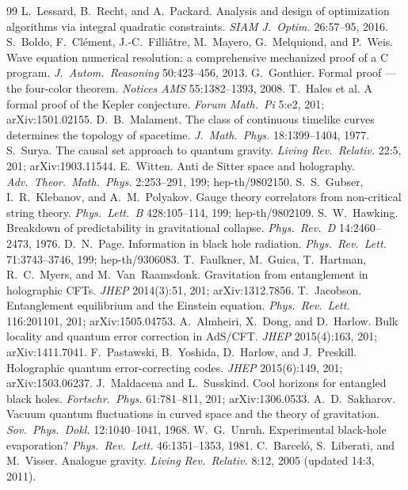 \documentclass[10pt,twocolumn]{article}
\theoremstyle{definition}
\begin{document}
\begin{thebibliography}{99}
 L.~Lessard, B.~Recht, and A.~Packard. Analysis and design of optimization algorithms via integral quadratic constraints. \emph{SIAM J.\ Optim.} 26:57--95, 2016.
 S.~Boldo, F.~Cl\'ement, J.-C.~Filli\^atre, M.~Mayero, G.~Melquiond, and P.~Weis. Wave equation numerical resolution: a comprehensive mechanized proof of a C program. \emph{J.\ Autom.\ Reasoning} 50:423--456, 2013.
 G.~Gonthier. Formal proof --- the four-color theorem. \emph{Notices AMS} 55:1382--1393, 2008.
 T.~Hales et al. A formal proof of the Kepler conjecture. \emph{Forum Math.\ Pi} 5:e2, 201; arXiv:1501.02155.
 D.~B.~Malament. The class of continuous timelike curves determines the topology of spacetime. \emph{J.\ Math.\ Phys.} 18:1399--1404, 1977.
 S.~Surya. The causal set approach to quantum gravity. \emph{Living Rev.\ Relativ.} 22:5, 201; arXiv:1903.11544.
 E.~Witten. Anti de Sitter space and holography. \emph{Adv.\ Theor.\ Math.\ Phys.} 2:253--291, 199; hep-th/9802150.
 S.~S.~Gubser, I.~R.~Klebanov, and A.~M.~Polyakov. Gauge theory correlators from non-critical string theory. \emph{Phys.\ Lett.\ B} 428:105--114, 199; hep-th/9802109.
 S.~W.~Hawking. Breakdown of predictability in gravitational collapse. \emph{Phys.\ Rev.\ D} 14:2460--2473, 1976.
 D.~N.~Page. Information in black hole radiation. \emph{Phys.\ Rev.\ Lett.} 71:3743--3746, 199; hep-th/9306083.
 T.~Faulkner, M.~Guica, T.~Hartman, R.~C.~Myers, and M.~Van~Raamsdonk. Gravitation from entanglement in holographic CFTs. \emph{JHEP} 2014(3):51, 201; arXiv:1312.7856.
 T.~Jacobson. Entanglement equilibrium and the Einstein equation. \emph{Phys.\ Rev.\ Lett.} 116:201101, 201; arXiv:1505.04753.
 A.~Almheiri, X.~Dong, and D.~Harlow. Bulk locality and quantum error correction in AdS/CFT. \emph{JHEP} 2015(4):163, 201; arXiv:1411.7041.
 F.~Pastawski, B.~Yoshida, D.~Harlow, and J.~Preskill. Holographic quantum error-correcting codes. \emph{JHEP} 2015(6):149, 201; arXiv:1503.06237.
 J.~Maldacena and L.~Susskind. Cool horizons for entangled black holes. \emph{Fortschr.\ Phys.} 61:781--811, 201; arXiv:1306.0533.
 A.~D.~Sakharov. Vacuum quantum fluctuations in curved space and the theory of gravitation. \emph{Sov.\ Phys.\ Dokl.} 12:1040--1041, 1968.
 W.~G.~Unruh. Experimental black-hole evaporation? \emph{Phys.\ Rev.\ Lett.} 46:1351--1353, 1981.
 C.~Barcel\'o, S.~Liberati, and M.~Visser. Analogue gravity. \emph{Living Rev.\ Relativ.} 8:12, 2005 (updated 14:3, 2011).

\end{thebibliography}
\end{document}
